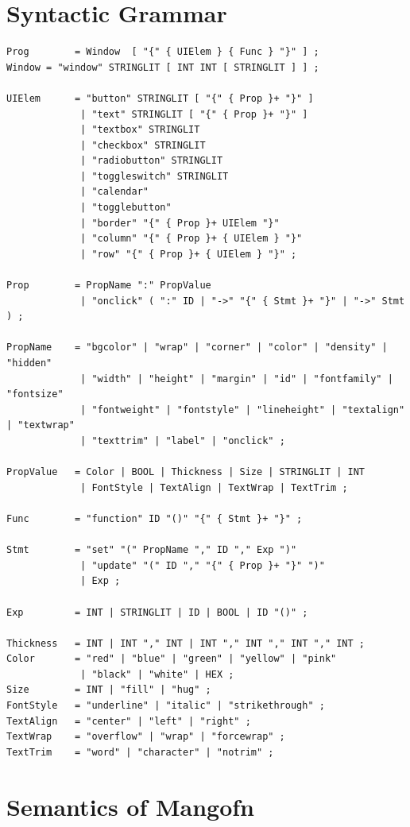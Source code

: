 \documentclass{article}
\begin{document}
\section{Syntactic Grammar}
\begin{verbatim}
Prog        = Window  [ "{" { UIElem } { Func } "}" ] ;
Window = "window" STRINGLIT [ INT INT [ STRINGLIT ] ] ;

UIElem      = "button" STRINGLIT [ "{" { Prop }+ "}" ]
             | "text" STRINGLIT [ "{" { Prop }+ "}" ]
             | "textbox" STRINGLIT
             | "checkbox" STRINGLIT
             | "radiobutton" STRINGLIT
             | "toggleswitch" STRINGLIT
             | "calendar"
             | "togglebutton"
             | "border" "{" { Prop }+ UIElem "}"
             | "column" "{" { Prop }+ { UIElem } "}"
             | "row" "{" { Prop }+ { UIElem } "}" ;

Prop        = PropName ":" PropValue
             | "onclick" ( ":" ID | "->" "{" { Stmt }+ "}" | "->" Stmt ) ;

PropName    = "bgcolor" | "wrap" | "corner" | "color" | "density" | "hidden"
             | "width" | "height" | "margin" | "id" | "fontfamily" | "fontsize"
             | "fontweight" | "fontstyle" | "lineheight" | "textalign" | "textwrap"
             | "texttrim" | "label" | "onclick" ;

PropValue   = Color | BOOL | Thickness | Size | STRINGLIT | INT
             | FontStyle | TextAlign | TextWrap | TextTrim ;

Func        = "function" ID "()" "{" { Stmt }+ "}" ;

Stmt        = "set" "(" PropName "," ID "," Exp ")"
             | "update" "(" ID "," "{" { Prop }+ "}" ")"
             | Exp ;

Exp         = INT | STRINGLIT | ID | BOOL | ID "()" ;

Thickness   = INT | INT "," INT | INT "," INT "," INT "," INT ;
Color       = "red" | "blue" | "green" | "yellow" | "pink"
             | "black" | "white" | HEX ;
Size        = INT | "fill" | "hug" ;
FontStyle   = "underline" | "italic" | "strikethrough" ;
TextAlign   = "center" | "left" | "right" ;
TextWrap    = "overflow" | "wrap" | "forcewrap" ;
TextTrim    = "word" | "character" | "notrim" ;
\end{verbatim}

\section{Semantics of Mangofn}
\end{document}
